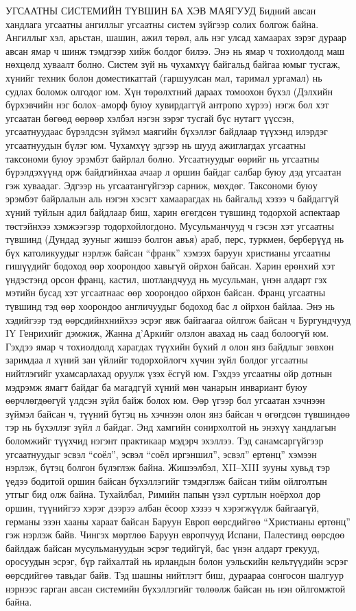 УГСААТНЫ СИСТЕМИЙН ТҮВШИН БА ХЭВ МАЯГУУД
Бидний авсан хандлага угсаатны ангиллыг угсаатны систем зүйгээр солих болгож байна. Ангиллыг хэл, арьстан, шашин, ажил төрөл, аль нэг улсад хамаарах зэрэг дураар авсан ямар ч шинж тэмдгээр хийж болдог билээ. Энэ нь ямар ч тохиолдолд маш нөхцөлд хуваалт болно. Систем зүй нь чухамхүү байгальд байгаа юмыг тусгаж, хүнийг техник болон доместикаттай (гаршуулсан мал, таримал ургамал) нь судлах боломж олгодог юм. Хүн төрөлхтний дараах томоохон бүхэл (Дэлхийн бүрхэвчийн нэг болох–аморф буюу хувирдаггүй антропо хүрээ) нэгж бол хэт угсаатан бөгөөд өөрөөр хэлбэл нэгэн зэрэг тусгай бүс нутагт үүссэн, угсаатнуудаас бүрэлдсэн зүймэл маягийн бүхэллэг байдлаар түүхэнд илэрдэг угсаатнуудын бүлэг юм. Чухамхүү эдгээр нь шууд ажиглагдах угсаатны таксономи буюу эрэмбэт байрлал болно. Угсаатнуудыг өөрийг нь угсаатны бүрэлдэхүүнд орж байдгийнхаа ачаар л оршин байдаг салбар буюу дэд угсаатан гэж хуваадаг. Эдгээр нь угсаатангүйгээр сарниж, мөхдөг.
Таксономи буюу эрэмбэт байрлалын аль нэгэн хэсэгт хамаарагдах нь байгальд хэзээ ч байдаггүй хүний туйлын адил байдлаар биш, харин өгөгдсөн түвшинд тодорхой аспектаар төстэйнхээ хэмжээгээр тодорхойлогдоно. Мусульманчууд ч гэсэн хэт угсаатны түвшинд (Дундад зууныг жишээ болгон авъя) араб, перс, туркмен, берберүүд нь бүх католикуудыг нэрлэж байсан “франк” хэмээх баруун христианы угсаатны гишүүдийг бодоход өөр хоорондоо хавьгүй ойрхон байсан. Харин ерөнхий хэт үндэстэнд орсон франц, кастил, шотландчууд нь мусульман, үнэн алдарт гэх мэтийн бусад хэт угсаатнаас өөр хоорондоо ойрхон байсан. Франц угсаатны түвшинд тэд өөр хоорондоо англичуудыг бодоход бас л ойрхон байлаа. Энэ нь хэдийгээр тэд өөрсдийнхнийхээ эсрэг явж байгаагаа ойлгож байсан ч Бургундчууд IY Генрихийг дэмжиж, Жанна д’Аркийг олзлон авахад нь саад болоогүй юм. Гэхдээ ямар ч тохиолдолд харагдах түүхийн бүхий л олон янз байдлыг зөвхөн заримдаа л хүний зан үйлийг тодорхойлогч хүчин зүйл болдог угсаатны нийтлэгийг ухамсарлахад оруулж үзэх ёсгүй юм. Гэхдээ угсаатны ойр дотнын мэдрэмж ямагт байдаг ба магадгүй хүний мөн чанарын инвариант буюу өөрчлөгдөөгүй үлдсэн зүйл байж болох юм. Өөр үгээр бол угсаатан хэчнээн зүймэл байсан ч, түүний бүтэц нь хэчнээн олон янз байсан ч өгөгдсөн түвшиндөө тэр нь бүхэллэг зүйл л байдаг.
Энд хамгийн сонирхолтой нь энэхүү хандлагын боломжийг түүхчид нэгэнт практикаар мэдэрч эхэллээ. Тэд санамсаргүйгээр угсаатнуудыг эсвэл “соёл”, эсвэл “соёл иргэншил”, эсвэл” ертөнц” хэмээн нэрлэж, бүтэц болгон бүлэглэж байна. Жишээлбэл, XII–XIII зууны хувьд тэр үедээ бодитой оршин байсан бүхэллэгийг тэмдэглэж байсан тийм ойлголтын утгыг бид олж байна. Тухайлбал, Римийн папын үзэл суртлын ноёрхол дор оршин, түүнийгээ хэрэг дээрээ албан ёсоор хэзээ ч хэрэгжүүлж байгаагүй, германы эзэн хааны хараат байсан Баруун Европ өөрсдийгөө “Христианы ертөнц” гэж нэрлэж байв. Чингэх мөртлөө Баруун европчууд Испани, Палестинд өөрсдөө байлдаж байсан мусульмануудын эсрэг төдийгүй, бас үнэн алдарт грекууд, оросуудын эсрэг, бүр гайхалтай нь ирландын болон уэльскийн кельтүүдийн эсрэг өөрсдийгөө тавьдаг байв. Тэд шашны нийтлэгт биш, дураараа сонгосон шалгуур нэрнээс гарган авсан системийн бүхэллэгийг төлөөлж байсан нь нэн ойлгомжтой байна.
